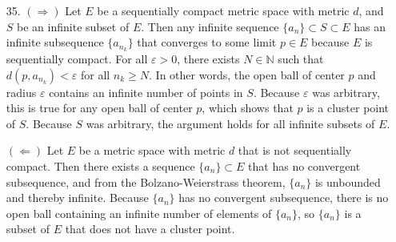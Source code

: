 \documentclass[a4paper,12pt]{article}
\begin{document}
\begin{enumerate}
        \item[35.]
            $(\Rightarrow)$ Let $E$ be a sequentially compact metric space with metric $d$, and $S$ be an infinite subset of $E$. Then any infinite sequence $\{ a_n \} \subset S \subset E$ has an infinite subsequence $\{ a_{n_k} \}$ that converges to some limit $p \in E$ because $E$ is sequentially compact. For all $\varepsilon > 0$, there exists $N \in \mathbb{N}$ such that $d(p, a_{n_k}) < \varepsilon$ for all $n_k \geq N$. In other words, the open ball of center $p$ and radius $\varepsilon$ contains an infinite number of points in $S$. Because $\varepsilon$ was arbitrary, this is true for any open ball of center $p$, which shows that $p$ is a cluster point of $S$. Because $S$ was arbitrary, the argument holds for all infinite subsets of $E$. \par
            $(\Leftarrow)$ Let $E$ be a metric space with metric $d$ that is not sequentially compact. Then there exists a sequence $\{ a_n \} \subset E$ that has no convergent subsequence, and from the Bolzano-Weierstrass theorem, $\{ a_n \}$ is unbounded and thereby infinite. Because $\{ a_n \}$ has no convergent subsequence, there is no open ball containing an infinite number of elements of $\{ a_n \}$, so $\{ a_n \}$ is a subset of $E$ that does not have a cluster point.
    \end{enumerate}
\end{document}
